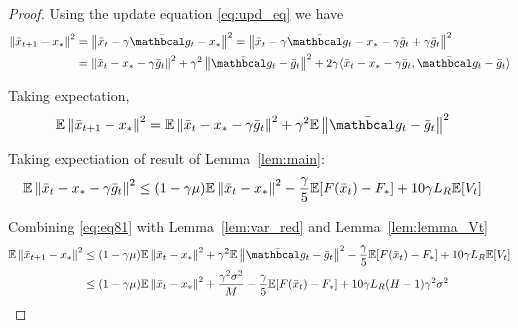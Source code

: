 \begin{proof}
    Using the update equation \eqref{eq:upd_eq} we have
    \begin{align}
        \norm{\bar{x}_{t+1}-x_*}^2
        &= \norm{\bar{x}_{t} - \gamma \bar {\mc{g_t}} - x_*}^2
        = \norm{\bar{x}_{t} - \gamma \bar {\mc{g_t}} - x_* - \gamma \bar{g}_t + \gamma \bar{g}_t}^2 \\
        &= \norm{\bar{x}_t - x_* - \gamma \bar{g}_t}^2 
        + \gamma^2 \norm{\bar {\mc{g_t}} - \bar{g}_t}^2
        + 2 \gamma \inner{\bar{x}_t - x_* - \gamma \bar{g}_t}{\bar {\mc{g_t}} - \bar{g}_t}
    \end{align}
    
    Taking expectation, 
    \begin{align}
        \E \norm{\bar{x}_{t+1}-x_*}^2
        &= \E \norm{\bar{x}_t - x_* - \gamma \bar{g}_t}^2
        + \gamma^2 \E \norm{ \bar {\mc{g_t}} - \bar{g}_t}^2 \label{eq:eq81}
    \end{align}
    
    
    Taking expectiation of result of Lemma~\ref{lem:main}:
    \begin{align}
        \mathbb{E} \left\|\bar{x}_t - x_* - \gamma \bar{g}_t\right\|^2 
        &\leq (1 - \gamma \mu) \mathbb{E} \left\|\bar{x}_t - x_*\right\|^2 
        - \frac{\gamma}{5} \mathbb{E} [F(\bar{x}_t) - F_*] 
        + 10 \gamma L_R \mathbb{E} [V_t] \label{eq:eq82}
    \end{align}

    Combining \eqref{eq:eq81} with Lemma~\ref{lem:var_red} and Lemma~\ref{lem:lemma_Vt}
    \begin{align}
         \E \norm{\bar{x}_{t+1}-x_*}^2
        &\leq (1 - \gamma \mu) \E \norm{\bar{x}_t - x_*}^2 
        + \gamma^2 \E \norm{ \bar{\mc{g_t}} - \bar{g}_t}^2
        - \frac{\gamma}{5} \E [F(\bar{x}_t) - F_*] 
        + 10 \gamma L_R \E [V_t] \\
        &\leq
        (1 - \gamma \mu) \E \norm{\bar{x}_t - x_*}^2 
        + \frac{\gamma^2 \sigma^2}{M}
        - \frac{\gamma}{5} \E [F(\bar{x}_t) - F_*] 
        + 10 \gamma L_R (H-1) \gamma^2 \sigma^2
    \end{align}
\end{proof}